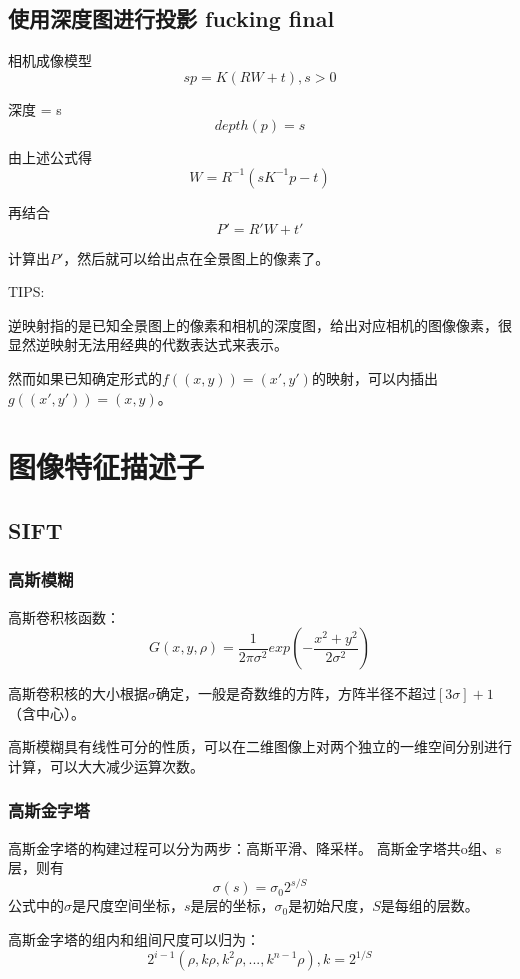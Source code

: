 \documentclass{ctexart}
\begin{document}
	\subsection{使用深度图进行投影 fucking final}
	\par 相机成像模型
	\begin{equation}
	s p = K (R W + t) , s>0
	\end{equation}
	\par 深度 = s
	\begin{equation}
	depth(p) = s
	\end{equation}
	
	\par 由上述公式得
	\begin{equation}
	W = R^{-1} ( s K^{-1} p - t)
	\end{equation}
	\par 再结合
	\begin{equation}
	P' = R' W + t'
	\end{equation}
	\par 计算出$P'$，然后就可以给出点在全景图上的像素了。
	\par TIPS:
	\par 逆映射指的是已知全景图上的像素和相机的深度图，给出对应相机的图像像素，很显然逆映射无法用经典的代数表达式来表示。
	\par 然而如果已知确定形式的$f((x,y))=(x',y')$的映射，可以内插出$g((x',y'))=(x,y)$。
	
	\section{图像特征描述子}
	\subsection{SIFT}
	\subsubsection{高斯模糊}
	高斯卷积核函数：
	\begin{equation}
	G(x,y,\rho)=\frac{1}{2 \pi \sigma^2} exp\left(-\frac{x^2+y^2}{2\sigma^2}\right)
	\end{equation}
	\par
	高斯卷积核的大小根据$\sigma$确定，一般是奇数维的方阵，方阵半径不超过$[3\sigma]+1$（含中心）。
	\par 高斯模糊具有线性可分的性质，可以在二维图像上对两个独立的一维空间分别进行计算，可以大大减少运算次数。
	\subsubsection{高斯金字塔}
	高斯金字塔的构建过程可以分为两步：高斯平滑、降采样。
	高斯金字塔共o组、s层，则有
	\begin{equation}
	\sigma(s)=\sigma_0 2^{s/S}
	\end{equation}
	公式中的$\sigma$是尺度空间坐标，$s$是层的坐标，$\sigma_0$是初始尺度，$S$是每组的层数。
	\par 高斯金字塔的组内和组间尺度可以归为：
	\begin{equation}
	2^{i-1} (\rho,k\rho,k^2\rho,...,k^{n-1}\rho),
	k=2^{1/S}
	\end{equation}
\end{document}
